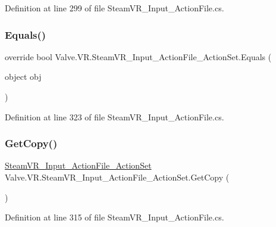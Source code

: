 Definition at line 299 of file Steam\+V\+R\+\_\+\+Input\+\_\+\+Action\+File.\+cs.

\mbox{\label{class_valve_1_1_v_r_1_1_steam_v_r___input___action_file___action_set_a27625a392b7fe2a7b6d59ee0f446a826}} 
\subsubsection{\texorpdfstring{Equals()}{Equals()}}
{\footnotesize\ttfamily override bool Valve.\+V\+R.\+Steam\+V\+R\+\_\+\+Input\+\_\+\+Action\+File\+\_\+\+Action\+Set.\+Equals (\begin{DoxyParamCaption}\item[{object}]{obj }\end{DoxyParamCaption})}



Definition at line 323 of file Steam\+V\+R\+\_\+\+Input\+\_\+\+Action\+File.\+cs.

\mbox{\label{class_valve_1_1_v_r_1_1_steam_v_r___input___action_file___action_set_aff6ac32c01750e5e418839244c9204a1}} 
\subsubsection{\texorpdfstring{GetCopy()}{GetCopy()}}
{\footnotesize\ttfamily \mbox{\hyperlink{class_valve_1_1_v_r_1_1_steam_v_r___input___action_file___action_set}{Steam\+V\+R\+\_\+\+Input\+\_\+\+Action\+File\+\_\+\+Action\+Set}} Valve.\+V\+R.\+Steam\+V\+R\+\_\+\+Input\+\_\+\+Action\+File\+\_\+\+Action\+Set.\+Get\+Copy (\begin{DoxyParamCaption}{ }\end{DoxyParamCaption})}



Definition at line 315 of file Steam\+V\+R\+\_\+\+Input\+\_\+\+Action\+File.\+cs.

